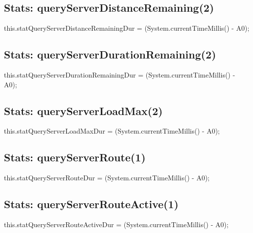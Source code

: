 \subsection{Stats: queryServerDistanceRemaining(2)}
\nwenddocs{}\endmoddef{}
this.statQueryServerDistanceRemainingDur = (System.currentTimeMillis() - A0);
\nwendcode{}\nwdocspar

\subsection{Stats: queryServerDurationRemaining(2)}
\nwenddocs{}\endmoddef{}
this.statQueryServerDurationRemainingDur = (System.currentTimeMillis() - A0);
\nwendcode{}\nwdocspar

\subsection{Stats: queryServerLoadMax(2)}
\nwenddocs{}\endmoddef{}
this.statQueryServerLoadMaxDur = (System.currentTimeMillis() - A0);
\nwendcode{}\nwdocspar

\subsection{Stats: queryServerRoute(1)}
\nwenddocs{}\endmoddef{}
this.statQueryServerRouteDur = (System.currentTimeMillis() - A0);
\nwendcode{}\nwdocspar

\subsection{Stats: queryServerRouteActive(1)}
\nwenddocs{}\endmoddef{}
this.statQueryServerRouteActiveDur = (System.currentTimeMillis() - A0);
\nwendcode{}\nwdocspar

